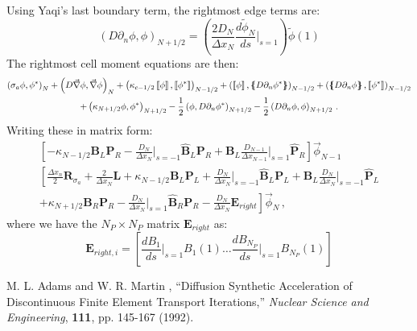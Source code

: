 \documentclass[11pt]{article}
\newcommand{\benum}{\begin{equation}}
\newcommand{\eenum}{\end{equation}}
\newcommand{\del}{\ensuremath{ \vec{\nabla} }}
\newcommand{\p}{\ensuremath{ d}}
\newcommand{\jmp}[1]{\ensuremath{\left\llbracket #1 \right\rrbracket}}
\newcommand{\avg}[1]{\ensuremath{ \left \{ \hspace{-0.055in} \left \{ #1  \right \}\hspace{-0.055in} \right \} }}
\newcommand{\pec}{\, ,}
\newcommand{\pep}{\, .}
\begin{document}
Using Yaqi's last boundary term, the rightmost edge terms are:
\benum
\left( D \partial_n \phi , \phi \right)_{N+1/2} = \left( \frac{2D_N}{\Delta x_N} \frac{\p \widetilde{\phi}_N}{\p s} \bigg \lvert_{s=1} \right) \widetilde{\phi}(1) 
\eenum
The rightmost cell moment equations are then:
\begin{multline*}
\left( \sigma_a\phi,\phi^* \right)_N + \left( D\del\phi,\del\phi \right)_N
 +\left( \kappa_{c-1/2} \jmp{\phi},\jmp{\phi^*}\right)_{N-1/2} 
 +\left(  \jmp{\phi}, \avg{ D\partial_n \phi^*}\right)_{N-1/2} 
 +\left( \avg{D\partial_n\phi}, \jmp{\phi^*} \right)_{N-1/2} \\
  +\left( \kappa_{N+1/2} \phi,\phi^*\right)_{N+1/2}
 -\frac{1}{2}\left( \phi,  D\partial_n \phi^*\right)_{N+1/2} 
 -\frac{1}{2}\left( D\partial_n\phi, \phi \right)_{N+1/2} \pep
\end{multline*}
Writing these in matrix form:
\begin{multline}
\left[ -\kappa_{N-1/2}\mathbf{B}_L\mathbf{P}_R - \frac{D_N}{\Delta x_N}\bigg \lvert_{s=-1} \widehat{\mathbf B}_L \mathbf{P}_R + \mathbf{B}_L \frac{D_{N-1}}{\Delta x_{N-1}} \bigg\lvert_{s=1} \widehat{\mathbf P}_R \right] \vec{\phi}_{N-1} \\
\left[\frac{\Delta x_n}{2} \mathbf{R}_{\sigma_a} + \frac{2}{\Delta x_N}\mathbf{L} +  \kappa_{N-1/2} \mathbf{B}_L \mathbf{P}_L + \frac{D_N}{\Delta x_N} \bigg \lvert_{s=-1} \widehat{\mathbf B}_L \mathbf{P}_L + \mathbf{B}_L \frac{D_N}{\Delta x_N}\bigg \lvert_{s=-1}\widehat{\mathbf P}_L \right.
 \\ \left. +\kappa_{N+1/2}\mathbf{B}_R \mathbf{P}_R - \frac{D_N}{\Delta x_N} \bigg \lvert_{s=1}\widehat{\mathbf B}_R \mathbf{P}_R - \frac{D_N}{\Delta x_N} \mathbf{E}_{right} \right] \vec{\phi}_N \pec
\end{multline}
where we have the $N_P \times N_P$ matrix $\mathbf{E}_{right}$ as:
\benum
\mathbf{E}_{right,i} = \left[ \frac{d B_1}{d s} \bigg \lvert_{s=1} B_1(1) \dots 
\frac{d B_{N_P}}{d s} \bigg \lvert_{s=1} B_{N_P}(1) \right]
\eenum

\begin{thebibliography}{20}

 M. L. Adams and W. R. Martin , ``Diffusion Synthetic Acceleration of Discontinuous Finite Element Transport Iterations,'' {\it Nuclear Science and Engineering}, {\bf 111}, pp. 145-167 (1992).

\end{thebibliography}
\end{document}
